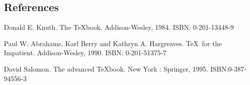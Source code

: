\begin{review}
\section*{References}

\begin{enumerate}[{$[$}1{$]$}]
\item Donald E. Knuth. The \TeX book. Addison-Wesley, 1984. ISBN: 0-201-13448-9
\item Paul W. Abrahams, Karl Berry and Kathryn A. Hargreaves. \TeX\ for the
  Impatient. Addison-Wesley, 1990. ISBN: 0-201-51375-7
\item David Salomon. The advanced \TeX book.  New York : Springer, 1995. ISBN:0-387-94556-3
\end{enumerate}

\end{review}